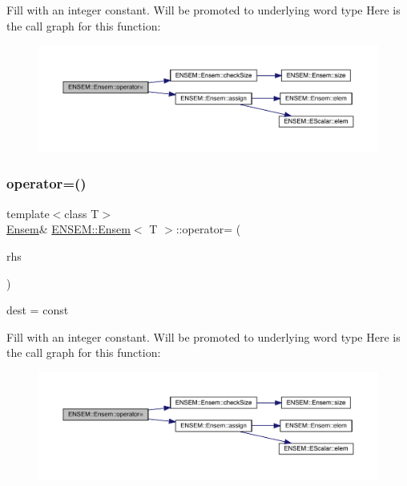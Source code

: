 Fill with an integer constant. Will be promoted to underlying word type Here is the call graph for this function\+:
\nopagebreak
\begin{figure}[H]
\begin{center}
\leavevmode
\includegraphics[width=350pt]{d7/d3e/classENSEM_1_1Ensem_a1331b77ba6b10ddefa983e39976b4db6_cgraph}
\end{center}
\end{figure}
\mbox{\label{classENSEM_1_1Ensem_a1331b77ba6b10ddefa983e39976b4db6}} 
\subsubsection{\texorpdfstring{operator=()}{operator=()}\hspace{0.1cm}{\footnotesize\ttfamily [2/10]}}
{\footnotesize\ttfamily template$<$class T$>$ \\
\mbox{\hyperlink{classENSEM_1_1Ensem}{Ensem}}\& \mbox{\hyperlink{classENSEM_1_1Ensem}{E\+N\+S\+E\+M\+::\+Ensem}}$<$ T $>$\+::operator= (\begin{DoxyParamCaption}\item[{const typename \mbox{\hyperlink{structENSEM_1_1WordType}{Word\+Type}}$<$ T $>$\+::Type\+\_\+t \&}]{rhs }\end{DoxyParamCaption})\hspace{0.3cm}{\ttfamily [inline]}}



dest = const 

Fill with an integer constant. Will be promoted to underlying word type Here is the call graph for this function\+:
\nopagebreak
\begin{figure}[H]
\begin{center}
\leavevmode
\includegraphics[width=350pt]{d7/d3e/classENSEM_1_1Ensem_a1331b77ba6b10ddefa983e39976b4db6_cgraph}
\end{center}
\end{figure}
\mbox{\label{classENSEM_1_1Ensem_a55913bc59bca1022f5189cbc86632c11}} 
